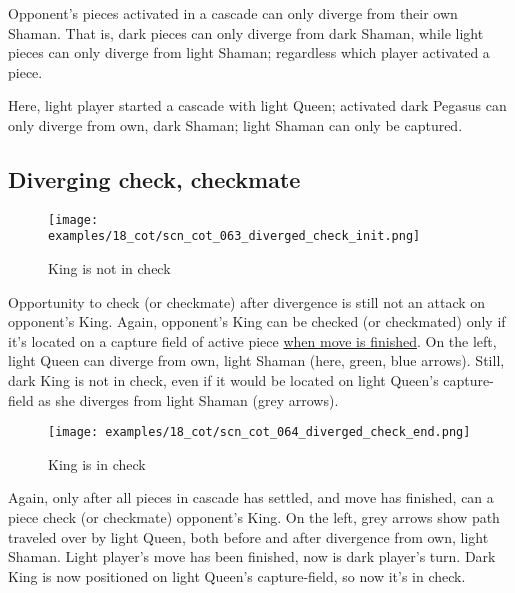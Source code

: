 \vspace*{-0.5\baselineskip}
Opponent's pieces activated in a cascade can only diverge from their own Shaman.
That is, dark pieces can only diverge from dark Shaman, while light pieces can only
diverge from light Shaman; regardless which player activated a piece.

Here, light player started a cascade with light Queen; activated dark Pegasus
can only diverge from own, dark Shaman; light Shaman can only be captured.

\clearpage %

\subsection*{Diverging check, checkmate}
\label{sec:Conquest of Tlalocan/Divergence/Diverging check, checkmate}

\vspace*{-0.7\baselineskip}
\noindent
\begin{wrapfigure}[14]{l}{0.4\textwidth}
\centering
\texttt{[image: examples/18\_cot/scn\_cot\_063\_diverged\_check\_init.png]}
\vspace*{-0.4\baselineskip}
\caption{King is not in check}
\label{fig:scn_cot_063_diverged_check_init}
\end{wrapfigure}
Opportunity to check (or checkmate) after divergence is still not an attack on
opponent's King. Again, opponent's King can be checked (or checkmated) only if
it's located on a capture field of active piece
\hyperref[fig:scn_mv_049_activating_piece_check_init]{when move is finished}.\newline
\indent
On the left, light Queen can diverge from own, light Shaman (here, green, blue
arrows). Still, dark King is not in check, even if it would be located on light
Queen's capture-field as she diverges from light Shaman (grey arrows).

\vspace*{0.4\baselineskip}
\noindent
\begin{wrapfigure}[13]{l}{0.4\textwidth}
\centering
\texttt{[image: examples/18\_cot/scn\_cot\_064\_diverged\_check\_end.png]}
\vspace*{-0.4\baselineskip}
\caption{King is in check}
\label{fig:scn_cot_064_diverged_check_end}
\end{wrapfigure}
Again, only after all pieces in cascade has settled, and move has finished, can
a piece check (or checkmate) opponent's King.\newline
\indent
On the left, grey arrows show path traveled over by light Queen, both before
and after divergence from own, light Shaman. Light player's move has been
finished, now is dark player's turn. Dark King is now positioned on light
Queen's capture-field, so now it's in check.

